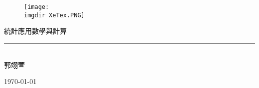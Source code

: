 
\makeindex 						

\fontsize{36}{30pt}\selectfont
\thispagestyle{empty}

\bigskip\bigskip\bigskip\bigskip
\begin{figure}[h]
    \centering
        \texttt{[image: \\imgdir XeTex.PNG]}
    \end{figure}

\bigskip\bigskip\bigskip\bigskip

\begin{flushright}
    {\BB 統計應用數學與計算}\\
    \rule{16cm}{0.2pt}\\
    \medskip\hfill \Large {\BB 郭翊萱}%
    \medskip \par\vspace*{-2pt}\hfill \small\today%
\end{flushright}

    
\fontsize{12}{22pt}\selectfont

\newpage
\cleardoublepage
\setcounter{tocdepth}{2} %


